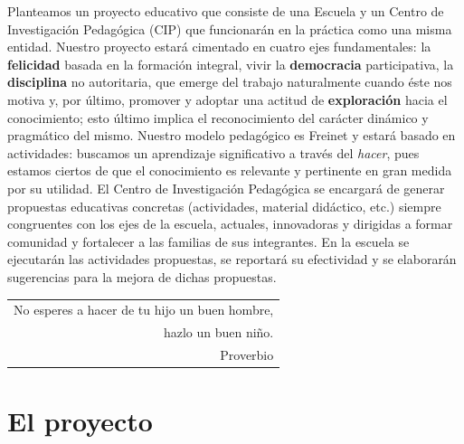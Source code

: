 \documentclass[10pt,letterpaper,oneside]{book}
\makeatletter
\newenvironment{myepigraph}
  {\par\hfill\itshape
   \begin{tabular}{@{}r@{\hspace{2em}}}} %
  {\end{tabular}\par\medskip}
\makeatother
\begin{document}
Planteamos un proyecto educativo que consiste de una Escuela y un Centro de Investigación Pedagógica (CIP) que funcionarán en la práctica como una misma entidad. Nuestro proyecto estará cimentado en cuatro ejes fundamentales: la {\bf felicidad} basada en la formación integral, vivir la {\bf democracia} participativa, la {\bf disciplina} no autoritaria, que emerge del trabajo naturalmente cuando éste nos motiva y, por último, promover y adoptar una actitud de {\bf exploración} hacia el conocimiento; esto último implica el reconocimiento del carácter dinámico y pragmático del mismo. Nuestro modelo pedagógico es Freinet y estará basado en actividades: buscamos un aprendizaje significativo a través del \emph{hacer}, pues estamos ciertos de que el conocimiento es relevante y pertinente en gran medida por su utilidad. El Centro de Investigación Pedagógica se encargará de generar propuestas educativas concretas (actividades, material didáctico, etc.) siempre congruentes con los ejes de la escuela, actuales, innovadoras y dirigidas a formar comunidad y fortalecer a las familias de sus integrantes. En la escuela se ejecutarán las actividades propuestas, se reportará su efectividad y se elaborarán sugerencias para la mejora de dichas propuestas.
\vspace{1cm}
\begin{myepigraph}No esperes a hacer de tu hijo un buen hombre,\\
hazlo un buen niño.
\vspace{0.1cm}\\
Proverbio
\end{myepigraph}

\section{El proyecto}
\end{document}
